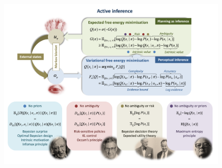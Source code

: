 \documentclass{article}
\begin{document}
\begin{figure}
    \centering
    \includegraphics[width=\textwidth]{FigureEFEinterpretations.png}

\end{figure}
\end{document}
